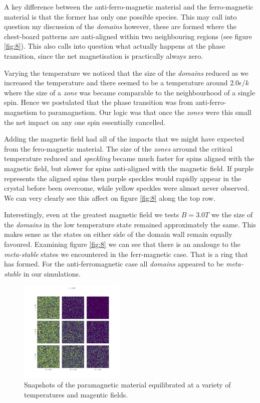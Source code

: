 \documentclass[a4paper, twocolumn]{article}
\begin{document}
A key difference between the anti-ferro-magnetic material and the %
ferro-magnetic material is that the former has only one possible %
species. This may call into question my discussion of the \emph{domains} %
however, these are formed where the chest-board patterns are %
anti-aligned within two neighbouring regions (see figure \ref{fig:8}). %
This also calls into question what actually happens at the phase transition, %
since the net magnetisation is practically always zero. 


Varying the temperature we noticed that the size of the \emph{domains} %
reduced as we increased the temperature and there seemed to be a %
temperature around \(2.0 \epsilon / k\) where the size of a \emph{zone} %
was became comparable to the neighbourhood of a single spin. %
Hence we postulated that the phase transition was from anti-ferro-magnetism %
to paramagnetism. Our logic was that once the \emph{zones} were this %
small the net impact on any one spin essentially cancelled.


Adding the magnetic field had all of the impacts that we might have %
expected from the fero-magnetic material. The size of the \emph{zones} %
arround the critical temperature reduced and \emph{speckling} became %
much faster for spins aligned with the magnetic field, but slower for %
spins anti-aligned with the magnetic field. If purple represents the %
aligned spins then purple speckles would rapidly appear in the crystal %
before been overcome, while yellow speckles were almost never observed. %
We can very clearly see this affect on figure \ref{fig:8} along the top %
row. 


Interestingly, even at the greatest magnetic field we tests \(B = 3.0T\) %
we the size of the \emph{domains} in the low temperature state remained %
approximately the same. This makes sense as the states on either side %
of the domain wall remain equally favoured. Examining figure \ref{fig:8} %
we can see that there is an analouge to the \emph{meta-stable} states %
we encountered in the ferr-magnetic case. That is a ring that has formed. %
For the anti-ferromagnetic case all \emph{domains} appeared to be %
\emph{meta-stable} in our simulations. 


\begin{figure}[h]
    \centering
    \includegraphics[width=0.45\textwidth]{pub/figures/external_field_epsilon_zero.pdf}
    \caption{Snapshots of the paramagnetic material equilibrated at %
        a variety of temperatures and magentic fields.}
    \label{fig:9}
\end{figure}
\end{document}
